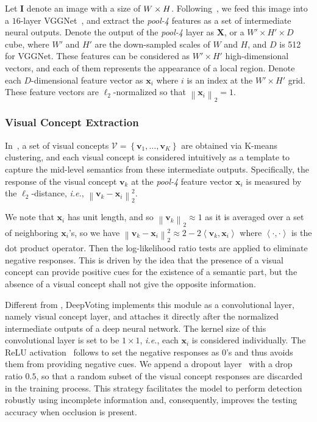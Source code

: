 \documentclass[10pt,twocolumn,letterpaper]{article}
\begin{document}
  Let $\mathbf{I}$ denote an image with a size of $W\times H \time 3$. Following~\cite{wang2017detecting}, we feed this image into a $16$-layer VGGNet~\cite{Simonyan_2015_Very}, and extract the {\em pool-4} features as a set of intermediate neural outputs. Denote the output of the {\em pool-4} layer as $\mathbf{X}$, or a $W'\times H'\times D$ cube, where $W'$ and $H'$ are the down-sampled scales of $W$ and $H$, and ${D}$ is 512 for VGGNet. These features can be considered as $W'\times H'$ high-dimensional vectors, and each of them represents the appearance of a local region. Denote each $D$-dimensional feature vector as $\mathbf{x}_i$ where $i$ is an index at the $W'\times H'$ grid. These feature vectors are $\ell_2$-normalized so that ${\left\|\mathbf{x}_i\right\|_2}={1}$.


  \subsubsection{Visual Concept Extraction}
  \label{Framework:Formulation:Extraction}

  In~\cite{wang2017detecting}, a set of visual concepts ${\mathcal{V}}={\left\{\mathbf{v}_1,\ldots,\mathbf{v}_K\right\}}$ are obtained via K-means clustering, and each visual concept is considered intuitively as a template to capture the mid-level semantics from these intermediate outputs. Specifically, the response of the visual concept $\mathbf{v}_k$ at the {\em pool-4} feature vector $\mathbf{x}_i$ is measured by the $\ell_2$-distance, {\em i.e.}, $\left\|\mathbf{v}_k-\mathbf{x}_i\right\|_2^2$.

  We note that $\mathbf{x}_i$ has unit length, and so ${\left\|\mathbf{v}_k\right\|_2}\approx{1}$ as it is averaged over a set of neighboring $\mathbf{x}_i$'s, so we have ${\left\|\mathbf{v}_k-\mathbf{x}_i\right\|_2^2}\approx{2-2\left\langle\mathbf{v}_k,\mathbf{x}_i\right\rangle}$ where $\left\langle\cdot,\cdot\right\rangle$ is the dot product operator. Then the log-likelihood ratio tests are applied to eliminate negative responses. This is driven by the idea that the presence of a visual concept can provide positive cues for the existence of a semantic part, but the absence of a visual concept shall not give the opposite information.

  Different from \cite{wang2017detecting}, DeepVoting implements this module as a convolutional layer, namely visual concept layer, and attaches it directly after the normalized intermediate outputs of a deep neural network. The kernel size of this convolutional layer is set to be $1\times1$, {\em i.e.}, each $\mathbf{x}_i$ is considered individually. The ReLU activation~\cite{Nair_2010_Rectified} follows to set the negative responses as $0$'s and thus avoids them from providing negative cues. We append a dropout layer~\cite{Srivastava_2014_Dropout} with a drop ratio $0.5$, so that a random subset of the visual concept responses are discarded in the training process.
  This strategy facilitates the model to perform detection robustly using incomplete information and, consequently, improves the testing accuracy when occlusion is present.
\end{document}
